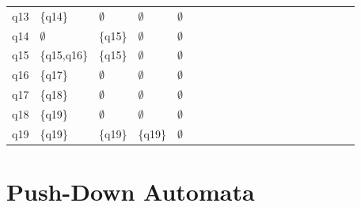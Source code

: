 \documentclass[12pt,a4paper]{report}
\begin{document}
\begin{center}
\begin{table}[ht]
\begin{tabular}{ l l l l l l l l l l l l l l l l l l l l }
q13   & \{q14\}     & $\emptyset$ & $\emptyset$            & $\emptyset$             &  &  &  &  &  &  &  &  &  &  &  &  &  &  &  \\
q14   & $\emptyset$ & \{q15\}     & $\emptyset$            & $\emptyset$             &  &  &  &  &  &  &  &  &  &  &  &  &  &  &  \\
q15   & \{q15,q16\} & \{q15\}     & $\emptyset$            & $\emptyset$             &  &  &  &  &  &  &  &  &  &  &  &  &  &  &  \\
q16   & \{q17\}     & $\emptyset$ & $\emptyset$            & $\emptyset$             &  &  &  &  &  &  &  &  &  &  &  &  &  &  &  \\
q17   & \{q18\}     & $\emptyset$ & $\emptyset$            & $\emptyset$             &  &  &  &  &  &  &  &  &  &  &  &  &  &  &  \\
q18   & \{q19\}     & $\emptyset$ & $\emptyset$            & $\emptyset$             &  &  &  &  &  &  &  &  &  &  &  &  &  &  &  \\
q19   & \{q19\}     & \{q19\}     & \{q19\}                & $\emptyset$ &  &  &  &  &  &  &  &  &  &  &  &  &  &  & \\ \hline

\end{tabular}
\end{table}

\end{center}

\clearpage











































\chapter{Push-Down Automata}
\end{document}
